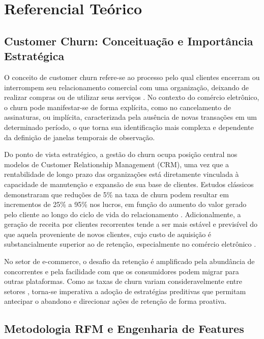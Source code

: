 \chapter{Referencial Teórico} \label{Cap:ReferencialTeorico}

\FloatBarrier
\section{Customer Churn: Conceituação e Importância Estratégica} \label{sec:churn-conceito}

O conceito de customer churn refere-se ao processo pelo qual clientes encerram ou interrompem seu relacionamento comercial com uma organização, deixando de realizar compras ou de utilizar seus serviços \cite{manzoor2024}. No contexto do comércio eletrônico, o churn pode manifestar-se de forma explícita, como no cancelamento de assinaturas, ou implícita, caracterizada pela ausência de novas transações em um determinado período, o que torna sua identificação mais complexa e dependente da definição de janelas temporais de observação.

Do ponto de vista estratégico, a gestão do churn ocupa posição central nos modelos de Customer Relationship Management (CRM), uma vez que a rentabilidade de longo prazo das organizações está diretamente vinculada à capacidade de manutenção e expansão de sua base de clientes. Estudos clássicos demonstraram que reduções de 5\% na taxa de churn podem resultar em incrementos de 25\% a 95\% nos lucros, em função do aumento do valor gerado pelo cliente ao longo do ciclo de vida do relacionamento \cite{reichheld2000}. Adicionalmente, a geração de receita por clientes recorrentes tende a ser mais estável e previsível do que aquela proveniente de novos clientes, cujo custo de aquisição é substancialmente superior ao de retenção, especialmente no comércio eletrônico \cite{reichheld2000}.

No setor de e-commerce, o desafio da retenção é amplificado pela abundância de concorrentes e pela facilidade com que os consumidores podem migrar para outras plataformas. Como as taxas de churn variam consideravelmente entre setores \cite{imani2025}, torna-se imperativa a adoção de estratégias preditivas que permitam antecipar o abandono e direcionar ações de retenção de forma proativa.

\FloatBarrier
\section{Metodologia RFM e Engenharia de Features} \label{sec:rfm}

